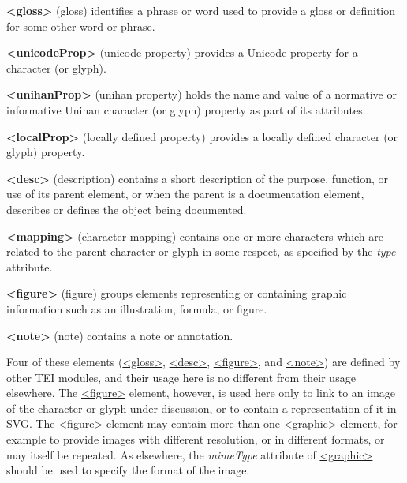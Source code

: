 \begin{sansreflist}
  
\item [\textbf{<gloss>}] (gloss) identifies a phrase or word used to provide a gloss or definition for some other word or phrase.
\item [\textbf{<unicodeProp>}] (unicode property) provides a Unicode property for a character (or glyph).
\item [\textbf{<unihanProp>}] (unihan property) holds the name and value of a normative or informative Unihan character (or glyph) property as part of its attributes.
\item [\textbf{<localProp>}] (locally defined property) provides a locally defined character (or glyph) property.
\item [\textbf{<desc>}] (description) contains a short description of the purpose, function, or use of its parent element, or when the parent is a documentation element, describes or defines the object being documented. 
\item [\textbf{<mapping>}] (character mapping) contains one or more characters which are related to the parent character or glyph in some respect, as specified by the {\itshape type} attribute.
\item [\textbf{<figure>}] (figure) groups elements representing or containing graphic information such as an illustration, formula, or figure.
\item [\textbf{<note>}] (note) contains a note or annotation.
\end{sansreflist}
\par
Four of these elements (\hyperref[TEI.gloss]{<gloss>}, \hyperref[TEI.desc]{<desc>}, \hyperref[TEI.figure]{<figure>}, and \hyperref[TEI.note]{<note>}) are defined by other TEI modules, and their usage here is no different from their usage elsewhere. The \hyperref[TEI.figure]{<figure>} element, however, is used here only to link to an image of the character or glyph under discussion, or to contain a representation of it in SVG. The \hyperref[TEI.figure]{<figure>} element may contain more than one \hyperref[TEI.graphic]{<graphic>} element, for example to provide images with different resolution, or in different formats, or may itself be repeated. As elsewhere, the {\itshape mimeType} attribute of \hyperref[TEI.graphic]{<graphic>} should be used to specify the format of the image.\par
